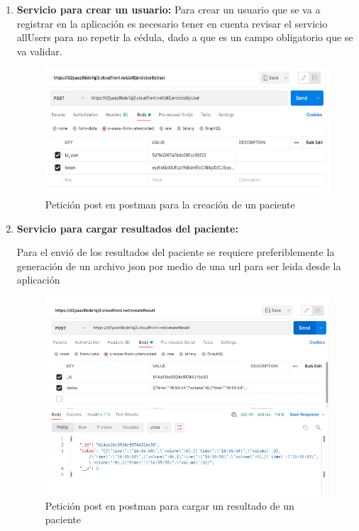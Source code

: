 \documentclass[12pt]{article}
\begin{document}
\begin{enumerate}
    \item \textbf{Servicio para crear un usuario:}
    Para crear un usuario que se va a registrar en la aplicación es necesario tener en cuenta revisar el servicio allUsers para no repetir la cédula, dado a que es un campo obligatorio que se va validar.
    
            \begin{figure}[ht]
            \centering
            \includegraphics[scale=0.5]{imag/presonline.png}
            \caption{Petición post en postman para la creación de un paciente }
            \label{6}
            \end{figure}
            \FloatBarrier
    
    

            
    \item \textbf{Servicio para cargar resultados del paciente:}
    
    Para el envió de los resultados del paciente se requiere preferiblemente la generación de un archivo json por medio de una url para ser leida desde la aplicación
   
    
            \begin{figure}[ht]
            \centering
            \includegraphics[scale=0.4]{imag/createresultonline.png}
            \caption{Petición post en postman para cargar un resultado de un paciente }
            \label{6}
            \end{figure}
            \FloatBarrier
            

\end{enumerate}
\end{document}
